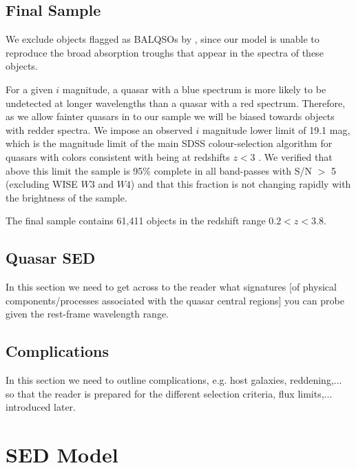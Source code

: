\subsection{Final Sample}

We exclude objects flagged as BALQSOs by \citet{shen11}, since our model is unable to reproduce the broad absorption troughs that appear in the spectra of these objects. 


For a given $i$ magnitude, a quasar with a blue spectrum is more likely to be undetected at longer wavelengths than a quasar with a red spectrum. 
Therefore, as we allow fainter quasars in to our sample we will be biased towards objects with redder spectra.
We impose an observed $i$ magnitude lower limit of 19.1 mag, which is the magnitude limit of the main SDSS colour-selection algorithm for quasars with colors consistent with being at redshifts $z < 3$ \citep{richards02}. 
We verified that above this limit the sample is 95\% complete in all band-passes with S/N $>$ 5 (excluding WISE $W3$ and $W4$) and that this fraction is not changing rapidly with the brightness of the sample. 

The final sample contains 61,411 objects in the redshift range $0.2 < z < 3.8$. 

\subsection{Quasar SED}

In this section we need to get across to the reader what signatures [of physical components/processes associated with the quasar central regions] you can probe given the rest-frame wavelength range. 

\subsection{Complications}

In this section we need to outline complications, e.g. host galaxies, reddening,... so that the reader is prepared for the different selection criteria, flux limits,... introduced later. 


\section{SED Model}

